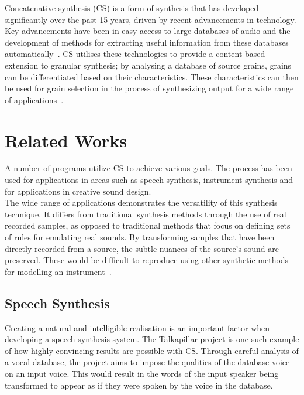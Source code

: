 \documentclass{scrartcl}
\begin{document}
    Concatenative synthesis (CS) is a form of synthesis that has developed
    significantly over the past 15 years, driven by recent advancements in
    technology. Key advancements have been in easy access to large databases of
    audio and the development of methods for extracting useful information from
    these databases automatically~\parencite[p.1]{Schwarz2006a}.  CS utilises
    these technologies to provide a content-based extension to granular
    synthesis; by analysing a database of source grains, grains can be
    differentiated based on their characteristics.  These characteristics can
    then be used for grain selection in the process of synthesizing output for
    a wide range of applications~\parencite[p.102]{Schwarz2007}.

    \section*{Related Works}
    A number of programs utilize CS to achieve various goals. The process has
    been used for applications in areas such as speech synthesis, instrument
    synthesis and for applications in creative sound design.\\
    The wide range of applications demonstrates the versatility of this
    synthesis technique. It differs from traditional synthesis methods through
    the use of real recorded samples, as opposed to traditional methods that
    focus on defining sets of rules for emulating real sounds. By transforming
    samples that have been directly recorded from a source, the subtle nuances
    of the source's sound are preserved. These would be difficult to reproduce
    using other synthetic methods for modelling an
    instrument~\parencite[p.24]{Maestre2009}.

    \subsection*{Speech Synthesis}
    Creating a natural and intelligible realisation is an important factor when
    developing a speech synthesis system. The Talkapillar project is one such
    example of how highly convincing results are possible with CS. Through
    careful analysis of a vocal database, the project aims to impose the
    qualities of the database voice on an input voice. This would result in the
    words of the input speaker being transformed to appear as if they were
    spoken by the voice in the database.~\parencite{Hueber}
    
\end{document}
